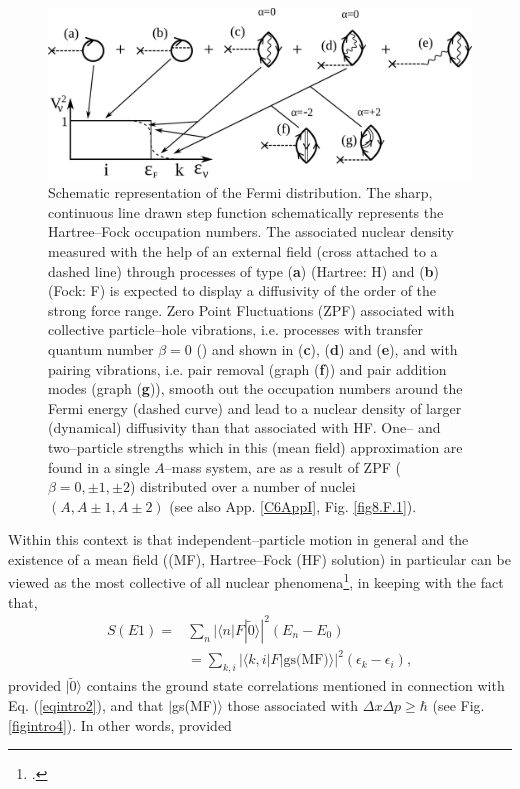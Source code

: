 \begin{figure}
\centerline {
\includegraphics*[width=12cm]{introduccion/figs/fig1_2_2}
}
\caption{Schematic representation of the Fermi distribution. The sharp, continuous line drawn step function schematically represents the Hartree--Fock occupation numbers. The associated nuclear density measured with the help of an external field (cross attached to a dashed line) through processes of type (\textbf{a}) (Hartree: H) and (\textbf{b}) (Fock: F) is expected to display a diffusivity of the order of the strong force range. Zero Point Fluctuations (ZPF) associated with collective particle--hole vibrations, i.e. processes with transfer quantum number $\beta=0$ (\cite{Bohr:64}) and shown in (\textbf{c}), (\textbf{d}) and (\textbf{e}), and with pairing vibrations, i.e. pair removal (graph (\textbf{f})) and pair addition modes (graph (\textbf{g})), smooth out the occupation numbers around the Fermi energy (dashed curve) and lead to a  nuclear density of larger (dynamical) diffusivity than that associated with HF. One-- and two--particle strengths which in this (mean field) approximation are found in a single $A$--mass system, are as a result of ZPF ($\beta=0,\pm 1, \pm 2$) distributed over a number of nuclei $(A, A\pm 1, A\pm 2)$ (see also App. \ref{C6AppI}, Fig. \ref{fig8.F.1}).}
\label{fig1.2.2}
\end{figure}
Within this context is that independent--particle motion in general and the existence of a mean field ((MF), Hartree--Fock (HF) solution) in particular can be viewed as the most collective of all nuclear phenomena\footnote{\cite{Mottelson:62}.}, in keeping with the fact that,
\begin{align}\label{eqintro6}
\nonumber S(E1)=&\sum_n |\langle n|F|\tilde 0\rangle|^2(E_n-E_0)\\
&=\sum_{k,i}|\langle k,i|F|\text{gs(MF)}\rangle|^2(\epsilon_{k}-\epsilon_i),
\end{align}
provided $|\tilde 0\rangle$ contains the ground state correlations mentioned in connection with Eq. (\ref{eqintro2}), and that $|$gs(MF)$\rangle$ those associated with $\Delta x\Delta p\geq \hbar$ (see Fig. \ref{figintro4}). In other words, provided
